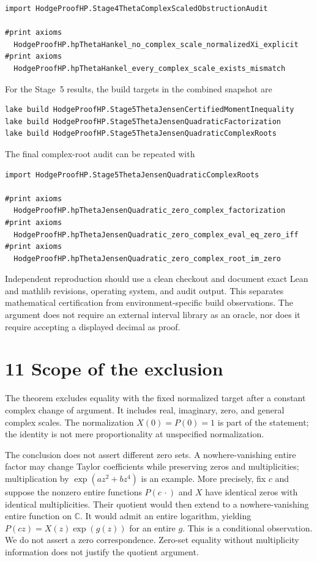 \documentclass[
  11pt,
]{article}
\begin{document}
\begin{verbatim}
import HodgeProofHP.Stage4ThetaComplexScaledObstructionAudit

#print axioms
  HodgeProofHP.hpThetaHankel_no_complex_scale_normalizedXi_explicit
#print axioms
  HodgeProofHP.hpThetaHankel_every_complex_scale_exists_mismatch
\end{verbatim}

For the Stage~5 results, the build targets in the combined snapshot are

\begin{verbatim}
lake build HodgeProofHP.Stage5ThetaJensenCertifiedMomentInequality
lake build HodgeProofHP.Stage5ThetaJensenQuadraticFactorization
lake build HodgeProofHP.Stage5ThetaJensenQuadraticComplexRoots
\end{verbatim}

The final complex-root audit can be repeated with

\begin{verbatim}
import HodgeProofHP.Stage5ThetaJensenQuadraticComplexRoots

#print axioms
  HodgeProofHP.hpThetaJensenQuadratic_zero_complex_factorization
#print axioms
  HodgeProofHP.hpThetaJensenQuadratic_zero_complex_eval_eq_zero_iff
#print axioms
  HodgeProofHP.hpThetaJensenQuadratic_zero_complex_root_im_zero
\end{verbatim}

Independent reproduction should use a clean checkout and document exact Lean and mathlib revisions, operating system, and audit output. This separates mathematical certification from environment-specific build observations. The argument does not require an external interval library as an oracle, nor does it require accepting a displayed decimal as proof.

\hypertarget{scope-of-the-exclusion}{%
\section{11 Scope of the exclusion}\label{scope-of-the-exclusion}}

The theorem excludes equality with the fixed normalized target after a constant complex change of argument. It includes real, imaginary, zero, and general complex scales. The normalization \(X(0) = P(0) = 1\) is part of the statement; the identity is not mere proportionality at unspecified normalization.

The conclusion does not assert different zero sets. A nowhere-vanishing entire factor may change Taylor coefficients while preserving zeros and multiplicities; multiplication by \(\exp\left( az^{2} + bz^{4} \right)\) is an example. More precisely, fix \(c\) and suppose the nonzero entire functions \(P(c\, \cdot )\) and \(X\) have identical zeros with identical multiplicities. Their quotient would then extend to a nowhere-vanishing entire function on \(\mathbb{C}\). It would admit an entire logarithm, yielding \(P(cz) = X(z)\exp\left( g(z) \right)\) for an entire \(g\). This is a conditional observation. We do not assert a zero correspondence. Zero-set equality without multiplicity information does not justify the quotient argument.
\end{document}
